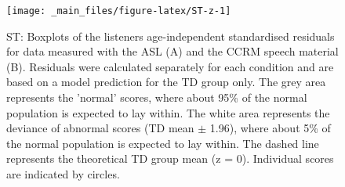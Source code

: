 \documentclass[a4paper, twoside]{templates/ociamthesis}
\begin{document}
\begin{figure}

{\centering \texttt{[image: \_main\_files/figure-latex/ST-z-1]} 

}

\caption{ST: Boxplots of the listeners age-independent standardised residuals for data measured with the ASL (A) and the CCRM speech material (B). Residuals were calculated separately for each condition and are based on a model prediction for the TD group only. The grey area represents the 'normal' scores, where about 95\% of the normal population is expected to lay within. The white area represents the deviance of abnormal scores (TD mean $\pm$ 1.96), where about 5\% of the normal population is expected to lay within. The dashed line represents the theoretical TD group mean (z = 0). Individual scores are indicated by circles.}\label{fig:ST-z}
\end{figure}
\end{document}
